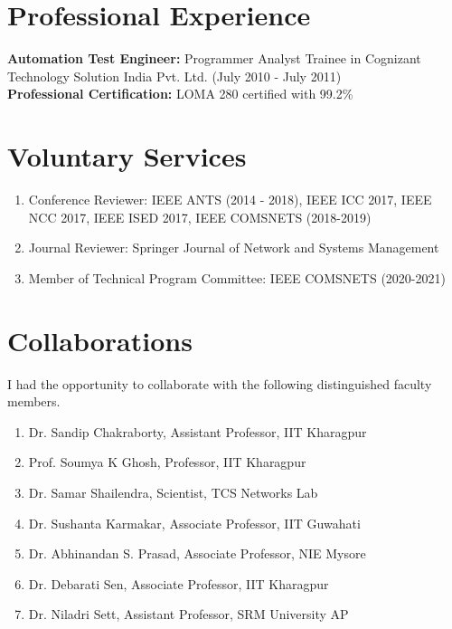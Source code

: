 \documentclass{article}
\begin{document}
\section{Professional Experience}
	{\bf Automation Test Engineer:} Programmer Analyst Trainee in Cognizant Technology Solution India Pvt. Ltd. (July 2010 - July 2011)\\[3ex]
	{\bf Professional Certification:} LOMA 280 certified with 99.2\%         
\section{Voluntary Services}
  \begin{enumerate}
   \item Conference Reviewer: IEEE ANTS (2014 - 2018), IEEE ICC 2017, IEEE NCC 2017, IEEE ISED 2017, IEEE COMSNETS (2018-2019)
   \item Journal Reviewer: Springer Journal of Network and Systems Management
   \item Member of Technical Program Committee: IEEE  COMSNETS (2020-2021)
  \end{enumerate}
\section{Collaborations}
I had the opportunity to collaborate with the following distinguished faculty members.
  \begin{enumerate}
  	\item Dr. Sandip Chakraborty, Assistant Professor, IIT Kharagpur
	\item Prof. Soumya K Ghosh, Professor, IIT Kharagpur
	\item Dr. Samar Shailendra, Scientist, TCS Networks Lab
	\item Dr. Sushanta Karmakar, Associate Professor, IIT Guwahati
	\item Dr. Abhinandan S. Prasad, Associate Professor, NIE Mysore
	\item Dr. Debarati Sen, Associate Professor, IIT Kharagpur
	\item Dr. Niladri Sett, Assistant Professor, SRM University AP
  \end{enumerate}
\end{document}

